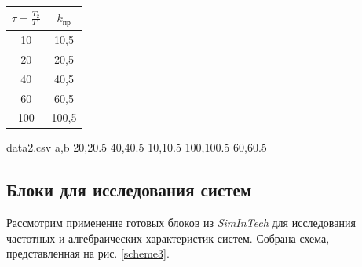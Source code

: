 	\noindent\begin{minipage}{.5\textwidth}
		\begin{center}
			\begin{tabular}{|c|c|}
				\hline
				$\tau = \frac{T_2}{T_1}$ & $k_\text{пр}$ \\[0.3em] \hline
				10                       & 10,5          \\ \hline
				20                       & 20,5          \\ \hline
				40                       & 40,5          \\ \hline
				60                       & 60,5          \\ \hline
				100                      & 100,5         \\ \hline
			\end{tabular}
		\end{center}
		\label{table}	
	\end{minipage}
	\begin{minipage}{.5\textwidth}
		\begin{filecontents*}{data2.csv}
			a,b
			20,20.5
			40,40.5
			10,10.5
			100,100.5
			60,60.5
		\end{filecontents*}
		
		\begin{center}
			\label{krp(tau)}	
		\end{center}
	\end{minipage}

	\subsection{Блоки для исследования систем}
	
	Рассмотрим применение готовых блоков из \textit{SimInTech} для исследования частотных и алгебраических характеристик систем. Собрана схема, представленная на рис. \ref{scheme3}.
	
